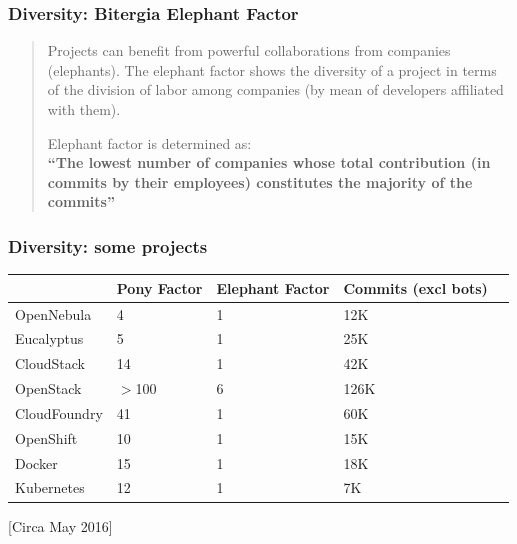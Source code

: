 \documentclass[17pt,aspectratio=169,hyperref=pdfusetitle]{beamer}
\begin{document}
\begin{frame}
\frametitle{Diversity: Bitergia Elephant Factor}

{\Large

\begin{quote}
  Projects can benefit from powerful collaborations from companies (elephants). The elephant factor shows the diversity of a project in terms of the division of labor among companies (by mean of developers affiliated with them).

  \vspace{.5cm}
  Elephant factor is determined as: \\
  {\bf ``The lowest number of companies whose total contribution (in commits by their employees) constitutes the majority of the commits''} \\
\end{quote}
}
\end{frame}

\begin{frame}
\frametitle{Diversity: some projects}

\begin{tabular}{|l|l|l|l|l|}
  \hline
              & Pony Factor & Elephant Factor & Commits (excl bots) \\ \hline \hline
OpenNebula    & 4           & 1               & 12K     \\ \hline
Eucalyptus    & 5           & 1               & 25K     \\ \hline
CloudStack    & 14          & 1               & 42K     \\ \hline
OpenStack     & $>$100      & 6               & 126K    \\ \hline
CloudFoundry  & 41          & 1               & 60K     \\ \hline
OpenShift     & 10          & 1               & 15K     \\ \hline
Docker        & 15          & 1               & 18K     \\ \hline
Kubernetes    & 12          & 1               & 7K      \\ \hline
\end{tabular}

\begin{center}
  [Circa May 2016]
\end{center}
\end{frame}
\end{document}
